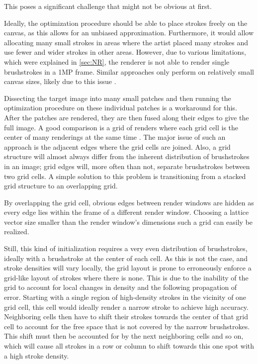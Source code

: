 This poses a significant challenge that might not be obvious at first.

Ideally, the optimization procedure should be able to place strokes freely on the canvas, as this allows for an unbiased approximation.
Furthermore, it would allow allocating many small strokes in areas where the artist placed many strokes and use fewer and wider strokes in other areas.
However, due to various limitations, which were explained in \ref{sec:NR}, the renderer is not able to render single brushstrokes in a 1MP frame. Similar approaches only perform on relatively small canvas sizes, likely due to this issue .

Dissecting the target image into many small patches and then running the optimization procedure on these individual patches is a workaround for this.
After the patches are rendered, they are then fused along their edges to give the full image.
A good comparison is a grid of renders where each grid cell is the center of many renderings at the same time .
The major issue of such an approach is the adjacent edges where the grid cells are joined.
Also, a grid structure will almost always differ from the inherent distribution of brushstrokes in an image;
grid edges will, more often than not, separate brushstrokes between two grid cells.
A simple solution to this problem is transitioning from a stacked grid structure to an overlapping grid. 

By overlapping the grid cell, obvious edges between render windows are hidden as every edge lies within the frame of a different render window.
Choosing a lattice vector size smaller than the render window's dimensions such a grid can easily be realized.

Still, this kind of initialization requires a very even distribution of brushstrokes, ideally with a brushstroke at the center of each cell.
As this is not the case, and stroke densities will vary locally, the grid layout is prone to erroneously enforce a grid-like layout of strokes where there is none.
This is due to the inability of the grid to account for local changes in density and the following propagation of error.
Starting with a single region of high-density strokes in the vicinity of one grid cell, this cell would ideally render a narrow stroke to achieve high accuracy.
Neighboring cells then have to shift their strokes towards the center of that grid cell to account for the free space that is not covered by the narrow brushstrokes.
This shift must then be accounted for by the next neighboring cells and so on, which will cause all strokes in a row or column to shift towards this one spot with a high stroke density.

